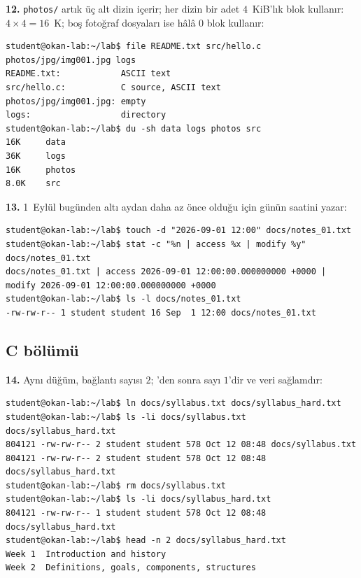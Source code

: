 \textbf{12.} \texttt{photos/} artık üç alt dizin içerir; her dizin bir adet $4$~KiB'lık blok kullanır: $4 \times 4 = 16$~K; boş fotoğraf dosyaları ise hâlâ $0$ blok kullanır:
\begin{lstlisting}[style=term,basicstyle=\ttfamily\scriptsize\color{light}]
student@okan-lab:~/lab$ file README.txt src/hello.c photos/jpg/img001.jpg logs
README.txt:            ASCII text
src/hello.c:           C source, ASCII text
photos/jpg/img001.jpg: empty
logs:                  directory
student@okan-lab:~/lab$ du -sh data logs photos src
16K     data
36K     logs
16K     photos
8.0K    src
\end{lstlisting}

\textbf{13.} 1~Eylül bugünden altı aydan daha az önce olduğu için  günün saatini yazar:
\begin{lstlisting}[style=term,basicstyle=\ttfamily\scriptsize\color{light}]
student@okan-lab:~/lab$ touch -d "2026-09-01 12:00" docs/notes_01.txt
student@okan-lab:~/lab$ stat -c "%n | access %x | modify %y" docs/notes_01.txt
docs/notes_01.txt | access 2026-09-01 12:00:00.000000000 +0000 | modify 2026-09-01 12:00:00.000000000 +0000
student@okan-lab:~/lab$ ls -l docs/notes_01.txt
-rw-rw-r-- 1 student student 16 Sep  1 12:00 docs/notes_01.txt
\end{lstlisting}

\subsection*{C bölümü}

\textbf{14.} Aynı düğüm, bağlantı sayısı $2$; 'den sonra sayı $1$'dir ve veri sağlamdır:
\begin{lstlisting}[style=term,basicstyle=\ttfamily\scriptsize\color{light}]
student@okan-lab:~/lab$ ln docs/syllabus.txt docs/syllabus_hard.txt
student@okan-lab:~/lab$ ls -li docs/syllabus.txt docs/syllabus_hard.txt
804121 -rw-rw-r-- 2 student student 578 Oct 12 08:48 docs/syllabus.txt
804121 -rw-rw-r-- 2 student student 578 Oct 12 08:48 docs/syllabus_hard.txt
student@okan-lab:~/lab$ rm docs/syllabus.txt
student@okan-lab:~/lab$ ls -li docs/syllabus_hard.txt
804121 -rw-rw-r-- 1 student student 578 Oct 12 08:48 docs/syllabus_hard.txt
student@okan-lab:~/lab$ head -n 2 docs/syllabus_hard.txt
Week 1  Introduction and history
Week 2  Definitions, goals, components, structures
\end{lstlisting}

